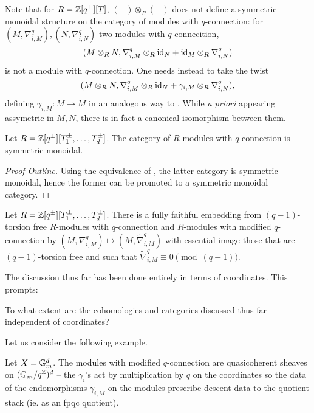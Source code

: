 Note that for $R=\mathbb{Z}[q^{\pm}][\underline{T}]$, $(-)\otimes_{R}(-)$ does not define a symmetric monoidal structure on the category of modules with $q$-connection: for $(M,\nabla_{i,M}^{q}),(N,\nabla_{i,N}^{q})$ two modules with $q$-connecition, $$(M\otimes_{R} N,\nabla_{i,M}^{q}\otimes_{R}\mathrm{id}_{N}+\mathrm{id}_{M}\otimes_{R}\nabla_{i,N}^{q})$$ is not a module with $q$-connection. One needs instead to take the twist $$(M\otimes_{R} N,\nabla_{i,M}^{q}\otimes_{R}\mathrm{id}_{N}+\gamma_{i,M}\otimes_{R}\nabla_{i,N}^{q}),$$
defining $\gamma_{i,M}:M\to M$ in an analogous way to . While \emph{a priori} appearing assymetric in $M,N$, there is in fact a canonical isomorphism between them. 
\begin{proposition}
    Let $R=\mathbb{Z}[q^{\pm}][T_{1}^{\pm},\dots,T_{d}^{\pm}]$. The category of $R$-modules with $q$-connection is symmetric monoidal. 
\end{proposition}
\begin{proof}[Proof Outline]
    Using the equivalence of , the latter category is symmetric monoidal, hence the former can be promoted to a symmetric monoidal category. 
\end{proof}
\begin{proposition}
    Let $R=\mathbb{Z}[q^{\pm}][T_{1}^{\pm},\dots,T_{d}^{\pm}]$. There is a fully faithful embedding from $(q-1)$-torsion free $R$-modules with $q$-connection and $R$-modules with modified $q$-connection by $(M,\nabla_{i,M}^{q})\mapsto(M,\widetilde{\nabla}_{i,M}^{q})$ with essential image those that are $(q-1)$-torsion free and such that $\widetilde{\nabla}_{i,M}^{q}\equiv0\pmod{(q-1)}$. 
\end{proposition}
The discussion thus far has been done entirely in terms of coordinates. This prompts:
\begin{question}
    To what extent are the cohomologies and categories discussed thus far independent of coordinates? 
\end{question}
Let us consider the following example. 
\begin{example}
    Let $X=\mathbb{G}_{m}^{d}$. The modules with modified $q$-connection are quasicoherent sheaves on $(\mathbb{G}_{m}/q^{\mathbb{Z}})^{d}$ -- the $\gamma_{i}$'s act by multiplication by $q$ on the coordinates so the data of the endomorphisms $\gamma_{i,M}$ on the modules prescribe descent data to the quotient stack (ie. as an fpqc quotient).
\end{example}

